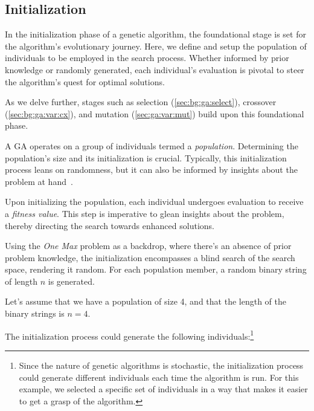 \subsection{Initialization}
\label{sec:genetic_algorithms:initialization}

  In the initialization phase of a genetic algorithm, the foundational stage is 
  set for the algorithm's evolutionary journey.
  Here, we define and setup the population of individuals to be employed in the 
  search process.
  Whether informed by prior knowledge or randomly generated, each individual's 
  evaluation is pivotal to steer the algorithm's quest for optimal solutions.

  As we delve further, stages such as selection 
  (\vref{sec:bg:ga:select}), crossover 
  (\vref{sec:bg:ga:var:cx}), and mutation (\vref{sec:ga:var:mut}) build upon 
  this foundational phase.

  A GA operates on a group of individuals termed a \emph{population}.
  Determining the population's size and its initialization is crucial.
  Typically, this initialization process leans on randomness, but it can also 
  be informed by insights about the problem at 
  hand~\autocite{dasguptaComparisonMultiobjectiveEvolutionary2008}.
  
  Upon initializing the population, each individual undergoes evaluation to 
  receive a \emph{fitness value}.
  This step is imperative to glean insights about the problem, thereby directing 
  the search towards enhanced solutions.

  Using the \emph{One Max} problem as a backdrop, where there's an absence of 
  prior problem knowledge, the initialization encompasses a blind search of the 
  search space, rendering it random.
  For each population member, a random binary string of length \(n\) is 
  generated.

  Let's assume that we have a population of size 4, and that the length of the 
  binary strings is \(n = 4\).

  The initialization process could generate the following individuals:\footnote{
    Since the nature of genetic algorithms is stochastic, the initialization 
    process could generate different individuals each time the algorithm is run.
    For this example, we selected a specific set of individuals in a way that 
    makes it easier to get a grasp of the algorithm.
  }

